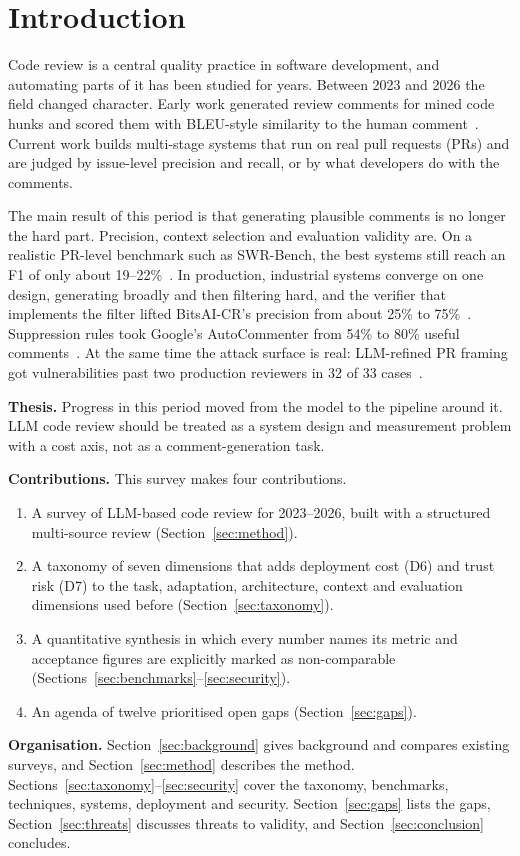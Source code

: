 \section{Introduction}\label{sec:intro}
Code review is a central quality practice in software development, and automating parts of it has been studied for years. Between 2023 and 2026 the field changed character. Early work generated review comments for mined code hunks and scored them with BLEU-style similarity to the human comment~\cite{li2022codereviewer}. Current work builds multi-stage systems that run on real pull requests (PRs) and are judged by issue-level precision and recall, or by what developers do with the comments.

The main result of this period is that generating plausible comments is no longer the hard part. Precision, context selection and evaluation validity are. On a realistic PR-level benchmark such as SWR-Bench, the best systems still reach an F1 of only about 19--22\%~\cite{zeng2025swrbench}. In production, industrial systems converge on one design, generating broadly and then filtering hard, and the verifier that implements the filter lifted BitsAI-CR's precision from about 25\% to 75\%~\cite{sun2025bitsai}. Suppression rules took Google's AutoCommenter from 54\% to 80\% useful comments~\cite{vijayvergiya2024ai}. At the same time the attack surface is real: LLM-refined PR framing got vulnerabilities past two production reviewers in 32 of 33 cases~\cite{alexopoulos2026when}.

\textbf{Thesis.} Progress in this period moved from the model to the pipeline around it. LLM code review should be treated as a system design and measurement problem with a cost axis, not as a comment-generation task.

\textbf{Contributions.} This survey makes four contributions.
\begin{enumerate}
\item A survey of LLM-based code review for 2023--2026, built with a structured multi-source review (Section~\ref{sec:method}).
\item A taxonomy of seven dimensions that adds deployment cost (D6) and trust risk (D7) to the task, adaptation, architecture, context and evaluation dimensions used before (Section~\ref{sec:taxonomy}).
\item A quantitative synthesis in which every number names its metric and acceptance figures are explicitly marked as non-comparable (Sections~\ref{sec:benchmarks}--\ref{sec:security}).
\item An agenda of twelve prioritised open gaps (Section~\ref{sec:gaps}).
\end{enumerate}

\textbf{Organisation.} Section~\ref{sec:background} gives background and compares existing surveys, and Section~\ref{sec:method} describes the method. Sections~\ref{sec:taxonomy}--\ref{sec:security} cover the taxonomy, benchmarks, techniques, systems, deployment and security. Section~\ref{sec:gaps} lists the gaps, Section~\ref{sec:threats} discusses threats to validity, and Section~\ref{sec:conclusion} concludes.
